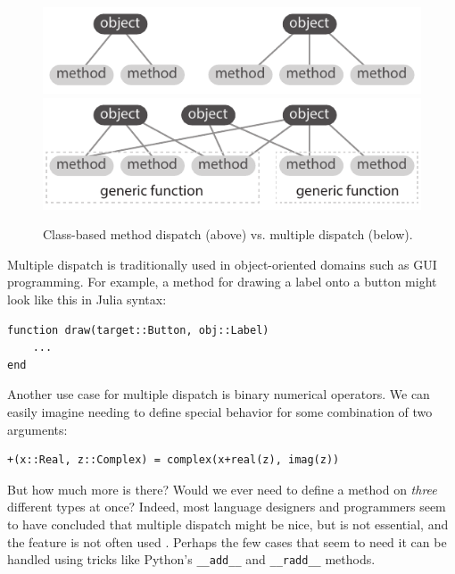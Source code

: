 \documentclass[preprint]{sigplanconf}
\newcommand{\code}[1]{\texttt{#1}}
\begin{document}
\begin{figure}
  \centering
  \includegraphics[width=\columnwidth]{fig-dispatch-class}
  \includegraphics[width=\columnwidth]{fig-dispatch-multiple}
  \caption{\label{fig:dispatch}Class-based method dispatch (above) vs. multiple dispatch (below).}
\end{figure}

Multiple dispatch is traditionally used in object-oriented domains
such as GUI programming. For example, a method for drawing a label onto a button might
look like this in Julia syntax:

\begin{minipage}{\linewidth}
\begin{verbatim}
function draw(target::Button, obj::Label)
    ...
end

\end{verbatim}
\end{minipage}

Another use case for multiple dispatch is binary numerical operators. We can easily imagine
needing to define special behavior for some combination of two arguments:

\begin{verbatim}
+(x::Real, z::Complex) = complex(x+real(z), imag(z))
\end{verbatim}

But how much more is there? Would we ever need to define a method on
\emph{three} different types at once? Indeed, most language designers and
programmers seem to have concluded that multiple dispatch might be nice, but is
not essential, and the feature is not often used \cite{Muschevici:2008}.
Perhaps the few cases that seem to need it can be handled using tricks like
Python's \code{\_\_add\_\_} and \code{\_\_radd\_\_} methods.
\end{document}
